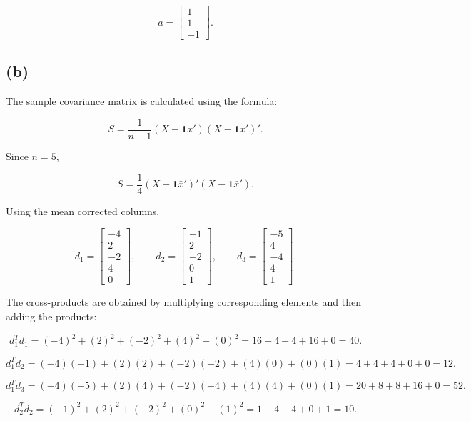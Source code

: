 \documentclass{article}
\begin{document}
$$
\boxed{
a=
\begin{bmatrix}
1\\
1\\
-1
\end{bmatrix}}.
$$


\subsection*{(b)}

The sample covariance matrix is calculated using the formula:

$$
S=
\frac{1}{n-1}
(X-\mathbf{1}\bar{x}')
(X-\mathbf{1}\bar{x}')'.
$$

Since $n=5$,

$$
S=
\frac14
(X-\mathbf{1}\bar{x}')
'(X-\mathbf{1}\bar{x}').
$$

\noindent
Using the mean corrected columns,

$$
d_1=
\begin{bmatrix}
-4\\
2\\
-2\\
4\\
0
\end{bmatrix},
\qquad
d_2=
\begin{bmatrix}
-1\\
2\\
-2\\
0\\
1
\end{bmatrix},
\qquad
d_3=
\begin{bmatrix}
-5\\
4\\
-4\\
4\\
1
\end{bmatrix}.
$$

\noindent
The cross-products are obtained by multiplying corresponding elements
and then adding the products:

$$
d_1^Td_1
=
(-4)^2+(2)^2+(-2)^2+(4)^2+(0)^2
=
16+4+4+16+0
=
40.
$$

$$
d_1^Td_2
=
(-4)(-1)+(2)(2)+(-2)(-2)+(4)(0)+(0)(1)
=
4+4+4+0+0
=
12.
$$

$$
d_1^Td_3
=
(-4)(-5)+(2)(4)+(-2)(-4)+(4)(4)+(0)(1)
=
20+8+8+16+0
=
52.
$$

$$
d_2^Td_2
=
(-1)^2+(2)^2+(-2)^2+(0)^2+(1)^2
=
1+4+4+0+1
=
10.
$$
\end{document}
